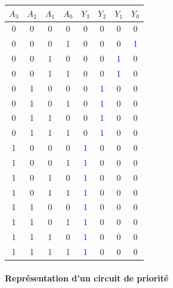 \documentclass{report}
\begin{document}
\begin{multicols*}{3}
\begin{table}[H]
  \centering
  \renewcommand{\arraystretch}{1.5}
  \setlength{\arrayrulewidth}{0.4pt}
  \scriptsize
  \begin{tabular}{|c|c|c|c||c|c|c|c|}
    \hline
    \rowcolor{lightBlue}
    \textcolor{myb}{$A_3$} & \textcolor{myb}{$A_2$} & \textcolor{myb}{$A_1$} & \textcolor{myb}{$A_0$} & \textcolor{myb}{$Y_3$} & \textcolor{myb}{$Y_2$} & \textcolor{myb}{$Y_1$} & \textcolor{myb}{$Y_0$} \\
    \hline
    \hline
    0 & 0 & 0 & 0 & 0 & 0 & 0 & 0 \\
    \rowcolor{lightBlue}
    0 & 0 & 0 & 1 & 0 & 0 & 0 & \textcolor{blue}{1} \\
    0 & 0 & 1 & 0 & 0 & 0 & \textcolor{blue}{1} & 0 \\
    \rowcolor{lightBlue}
    0 & 0 & 1 & 1 & 0 & 0 & \textcolor{blue}{1} & 0 \\
    0 & 1 & 0 & 0 & 0 & \textcolor{blue}{1} & 0 & 0 \\
    \rowcolor{lightBlue}
    0 & 1 & 0 & 1 & 0 & \textcolor{blue}{1} & 0 & 0 \\
    0 & 1 & 1 & 0 & 0 & \textcolor{blue}{1} & 0 & 0 \\
    \rowcolor{lightBlue}
    0 & 1 & 1 & 1 & 0 & \textcolor{blue}{1} & 0 & 0 \\
    1 & 0 & 0 & 0 & \textcolor{blue}{1} & 0 & 0 & 0 \\
    \rowcolor{lightBlue}
    1 & 0 & 0 & 1 & \textcolor{blue}{1} & 0 & 0 & 0 \\
    1 & 0 & 1 & 0 & \textcolor{blue}{1} & 0 & 0 & 0 \\
    \rowcolor{lightBlue}
    1 & 0 & 1 & 1 & \textcolor{blue}{1} & 0 & 0 & 0 \\
    1 & 1 & 0 & 0 & \textcolor{blue}{1} & 0 & 0 & 0 \\
    \rowcolor{lightBlue}
    1 & 1 & 0 & 1 & \textcolor{blue}{1} & 0 & 0 & 0 \\
    1 & 1 & 1 & 0 & \textcolor{blue}{1} & 0 & 0 & 0 \\
    \rowcolor{lightBlue}
    1 & 1 & 1 & 1 & \textcolor{blue}{1} & 0 & 0 & 0 \\
    \hline
  \end{tabular}
\end{table}

    \paragraph{Représentation d'un circuit de priorité}
    \mbox{}\vspace{0.5em}


\end{multicols*}
\end{document}
